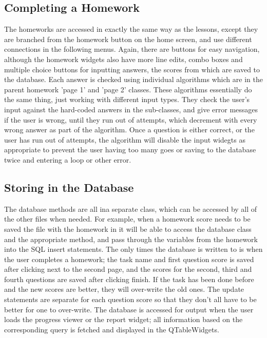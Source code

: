 \subsection{Completing a Homework}

The homeworks are accessed in exactly the same way as the lessons, except they are branched from the homework button on the home screen, and use different connections in the following menus. Again, there are buttons for easy navigation, although the homework widgets also have more line edits, combo boxes and multiple choice buttons for inputting answers, the scores from which are saved to the database. Each answer is checked using individual algorithms which are in the parent homework 'page 1' and 'page 2' classes. These algorithms essentially do the same thing, just working with different input types. They check the user's input against the hard-coded answers in the sub-classes, and give error messages if the user is wrong, until they run out of attempts, which decrement with every wrong answer as part of the algorithm. Once a question is either correct, or the user has run out of attempts, the algorithm will disable the input widegts as appropriate to prevent the user having too many goes or saving to the database twice and entering a loop or other error.

\subsection{Storing in the Database}

The database methods are all ina separate class, which can be accessed by all of the other files when needed. For example, when a homework score needs to be saved the file with the homework in it will be able to access the database class and the appropriate method, and pass through the variables from the homework into the SQL insert statements. The only times the database is written to is when the user completes a homework; the task name and first question score is saved after clicking next to the second page, and the scores for the second, third and fourth questions are saved after clicking finish. If the task has been done before and the new scores are better, they will over-write the old ones. The update statements are separate for each question score so that they don't all have to be better for one to over-write. The database is accessed for output when the user loads the progress viewer or the report widget; all information based on the corresponding query is fetched and displayed in the QTableWidgets.

